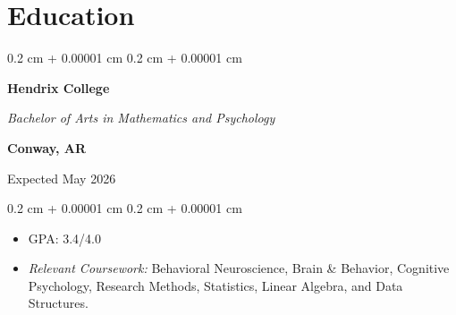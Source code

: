 \documentclass[10pt, letterpaper]{article}
\newenvironment{highlights}{
    \begin{itemize}[
        topsep=0.10 cm,
        parsep=0.10 cm,
        partopsep=0pt,
        itemsep=0pt,
        leftmargin=0.4 cm + 10pt
    ]
}{
    \end{itemize}
} %
\newenvironment{highlightsforbulletentries}{
    \begin{itemize}[
        topsep=0.10 cm,
        parsep=0.10 cm,
        partopsep=0pt,
        itemsep=0pt,
        leftmargin=10pt
    ]
}{
    \end{itemize}
} %
\newenvironment{onecolentry}{
    \begin{adjustwidth}{
        0.2 cm + 0.00001 cm
    }{
        0.2 cm + 0.00001 cm
    }
}{
    \end{adjustwidth}
} %
\newenvironment{twocolentry}[2][]{
    \onecolentry
    \def\secondColumn{#2}
    \setcolumnwidth{\fill, 4.5 cm}
    \begin{paracol}{2}
}{
    \switchcolumn \raggedleft \secondColumn
    \end{paracol}
    \endonecolentry
} %
\let\hrefWithoutArrow\href
\renewcommand{\href}[2]{\hrefWithoutArrow{#1}{\ifthenelse{\equal{#2}{}}{ }{#2 }}}
\begin{document}









\section{Education}


\begin{twocolentry}{
        \textbf{Conway, AR}

        Expected May 2026

    }
    \textbf{Hendrix College}

    \textit{Bachelor of Arts in Mathematics and Psychology}
\end{twocolentry}

\vspace{0.10 cm}

\begin{onecolentry}
    \begin{highlights}
        \item GPA: 3.4/4.0
        \item \textit{Relevant Coursework:} Behavioral Neuroscience, Brain \& Behavior, Cognitive Psychology, Research Methods, Statistics, Linear Algebra, and Data Structures.
    \end{highlights}
\end{onecolentry}
\end{document}
